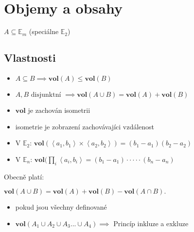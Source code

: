 \documentclass[../main.tex]{subfiles}
\begin{document}
\section{Objemy a obsahy}
\hspace{1.2mm}
$A \subseteq \mathbb{E}_m$ (speciálne $\mathbb{E}_2$)
\noindent

\subsection{Vlastnosti}
\hspace{1.2mm}
\begin{itemize}
    \item $A \subseteq B \implies \mathbf{vol}(A) \leq \mathbf{vol}(B)$
    \item $A, B \text{ disjunktní } \implies \mathbf{vol}(A \cup B) = \mathbf{vol}(A) + \mathbf{vol}(B)$
    \item $\mathbf{vol}$ je zachován isometrii
    \addtolength{\itemindent}{5mm}
    \item isometrie je zobrazení zachovávajíci vzdálenost
    \addtolength{\itemindent}{-5mm}
    \item V $\mathbb{E}_2$: $\mathbf{vol}(\left<a_1,b_1\right>\times \left<a_2,b_2\right>) = (b_1 - a_1)(b_2 - a_2)$
    \item V $\mathbb{E}_n$: $\mathbf{vol}(\prod_i \left<a_i,b_i\right> = (b_1 - a_1) \cdot \cdot \cdot \cdot \cdot (b_n-a_n)$
\end{itemize}

Obecně platí:

$\mathbf{vol}(A \cup B) = \mathbf{vol}(A)+\mathbf{vol}(B)-\mathbf{vol}(A \cap B).$

\begin{itemize}
    \addtolength{\itemindent}{5mm}
    \item pokud jsou všechny definované
    \item $\textbf{vol}(A_1\cup A_2\cup A_3...\cup A_4) \implies$ Princíp inkluze a exkluze
\end{itemize}
\end{document}
